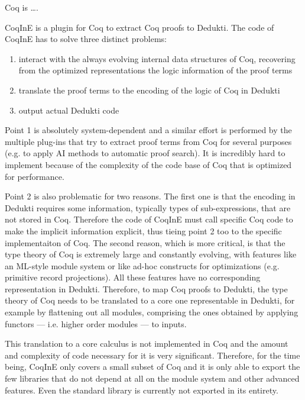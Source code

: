 

Coq is \ldots{}.

CoqInE is a plugin for Coq to extract Coq proofs to Dedukti. The code of CoqInE has to solve three distinct problems:
\begin{enumerate}
 \item interact with the always evolving internal data structures of Coq, recovering from the optimized representations the logic information of the proof terms
 \item translate the proof terms to the encoding of the logic of Coq in Dedukti
 \item output actual Dedukti code
\end{enumerate}

Point 1 is absolutely system-dependent and a similar effort is performed by the multiple plug-ins that try to extract proof terms from Coq for several purposes (e.g. to apply AI methods to automatic proof search). It is incredibly hard to implement because of the complexity of the code base of Coq that is optimized for performance.

Point 2 is also problematic for two reasons. The first one is that the encoding in Dedukti requires some information, typically types of sub-expressions, that are not stored in Coq. Therefore the code of CoqInE must call specific Coq code to make the implicit information explicit, thus tieing point 2 too to the specific implementaiton of Coq. The second reason, which is more critical, is that the type theory of Coq is extremely large and constantly evolving, with features like an ML-style module system or like ad-hoc constructs for optimizations (e.g. primitive record projections). All these features have no corresponding representation in Dedukti. Therefore, to map Coq proofs to Dedukti, the type theory of Coq needs to be translated to a core one representable in Dedukti, for example by flattening out all modules, comprising the ones obtained by applying functors --- i.e. higher order modules --- to inputs.

This translation to a core calculus is not implemented in Coq and the amount and complexity of code necessary for it is very significant. Therefore, for the time being, CoqInE only covers a small subset of Coq and it is only able to export the few libraries that do not depend at all on the module system and other advanced features. Even the standard library is currently not exported in its entirety.

